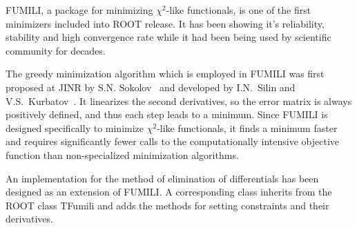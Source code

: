 
FUMILI, a package for minimizing $\chi^2$-like functionals, is one of the first minimizers included into ROOT release.
It has been showing it's reliability, stability and high convergence rate while it had been being used by scientific community for decades.

The greedy minimization algorithm which is employed in FUMILI was first proposed at JINR by S.N. Sokolov~\cite{fum_1st} and developed by I.N.~Silin and V.S.~Kurbatov~\cite{fum_prog}.
It linearizes the second derivatives, so the error matrix is always positively defined, and thus each step leads to a minimum.
Since FUMILI is designed specifically to minimize $\chi^2$-like functionals, it finds a minimum faster and requires significantly fewer calls to the computationally intensive objective function than non-specialized minimization algorithms.

An implementation for the method of elimination of differentials has been designed as an extension of FUMILI.
A corresponding class inherits from the ROOT class TFumili and adds the methods for setting constraints and their derivatives.



%

